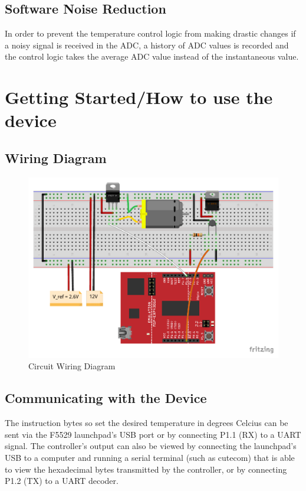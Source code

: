\documentclass{hitec}
\begin{document}


\subsection{Software Noise Reduction}
In order to prevent the temperature control logic from making drastic changes if a noisy signal is received in the ADC, a history of ADC values is recorded and the control logic takes the average ADC value instead of the instantaneous value.




\section{Getting Started/How to use the device}

\subsection{Wiring Diagram}

\begin{figure}[H]
    \centering
    \includegraphics[scale=0.8]{milestone_2_bb_bb.pdf}
    \caption{Circuit Wiring Diagram}
    \label{fig:circuit_bb}
\end{figure}

\subsection{Communicating with the Device}
The instruction bytes so set the desired temperature in degrees Celcius can be sent via the F5529 launchpad's USB port or by connecting P1.1 (RX) to a UART signal. The controller's output can also be viewed by connecting the launchpad's USB to a computer and running a serial terminal (such as cutecom) that is able to view the hexadecimal bytes transmitted by the controller, or by connecting P1.2 (TX) to a UART decoder.
\end{document}
